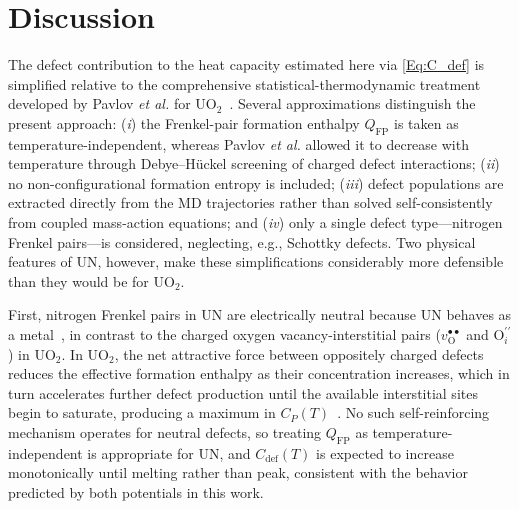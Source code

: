 \documentclass[preprint,12pt,sort&compress]{elsarticle}
\newcommand{\?}{\stackrel{?}{=}}
\begin{document}
\section{Discussion}

The defect contribution to the heat capacity estimated here via \cref{Eq:C_def} is simplified relative to the comprehensive statistical-thermodynamic treatment developed by Pavlov \textit{et al.} for UO$_2$~\cite{Pavlov2017}. Several approximations distinguish the present approach: (\textit{i}) the Frenkel-pair formation enthalpy $Q_\text{FP}$ is taken as temperature-independent, whereas Pavlov \textit{et al.} allowed it to decrease with temperature through Debye--H\"{u}ckel screening of charged defect interactions; (\textit{ii}) no non-configurational formation entropy is included; (\textit{iii}) defect populations are extracted directly from the MD trajectories rather than solved self-consistently from coupled mass-action equations; and (\textit{iv}) only a single defect type---nitrogen Frenkel pairs---is considered, neglecting, e.g., Schottky defects. Two physical features of UN, however, make these simplifications considerably more defensible than they would be for UO$_2$.

First, nitrogen Frenkel pairs in UN are electrically neutral because UN behaves as a metal~\cite{AbdulHameed2024b}, in contrast to the charged oxygen vacancy-interstitial pairs ($v_\text{O}^{\bullet\bullet}$ and $\text{O}_i^{\prime\prime}$) in UO$_2$. In UO$_2$, the net attractive force between oppositely charged defects reduces the effective formation enthalpy as their concentration increases, which in turn accelerates further defect production until the available interstitial sites begin to saturate, producing a maximum in $C_P(T)$~\cite{Pavlov2017,Cooper2014}. No such self-reinforcing mechanism operates for neutral defects, so treating $Q_\text{FP}$ as temperature-independent is appropriate for UN, and $C_\text{def}(T)$ is expected to increase monotonically until melting rather than peak, consistent with the behavior predicted by both potentials in this work.
\end{document}
